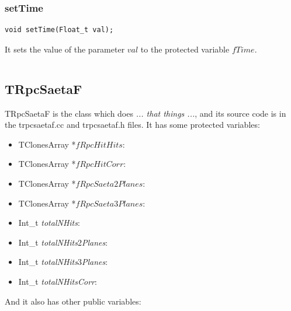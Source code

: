 \documentclass[a4paper]{book}
\begin{document}
\subsubsection{setTime}

\begin{lstlisting}
void setTime(Float_t val);
\end{lstlisting}

It sets the value of the parameter $val$ to the protected variable $fTime$.

\[\]




\subsection{TRpcSaetaF}

TRpcSaetaF is the class which does \textit{... that things ...}, and its source code is in the trpcsaetaf.cc and trpcsaetaf.h files. It has some protected variables:

\begin{itemize}
	\item TClonesArray  *$fRpcHitHits$: 
	\item TClonesArray  *$fRpcHitCorr$: 
	\item TClonesArray  *$fRpcSaeta2Planes$: 
	\item TClonesArray  *$fRpcSaeta3Planes$: 
	\item Int\_t \textit{totalNHits}: 
	\item Int\_t \textit{totalNHits}2\textit{Planes}: 
	\item Int\_t \textit{totalNHits}3\textit{Planes}: 
	\item Int\_t \textit{totalNHitsCorr}: 
\end{itemize}

And it also has other public variables:
\end{document}
